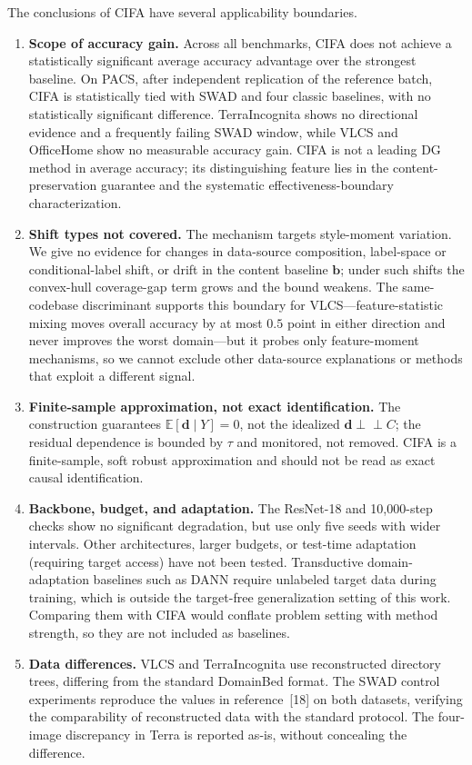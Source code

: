 \documentclass[electronics,article,submit,moreauthors]{Definitions/mdpi}
\newcommand{\add}[1]{\textcolor{addblue}{#1}}
\newcommand{\del}[1]{\textcolor{delred}{\st{#1}}}
\def\add#1{#1}
\def\del#1{}
\begin{document}
The conclusions of CIFA have several applicability boundaries.
\begin{enumerate}
\item \textbf{Scope of accuracy gain.} Across all benchmarks, CIFA does not achieve a statistically significant average accuracy advantage over the strongest baseline. On PACS, after independent replication of the reference batch, \del{CIFA is equivalent to SWAD and four classic baselines.}
\add{CIFA is statistically tied with SWAD and four classic baselines, with no statistically significant difference.} TerraIncognita shows no directional evidence and a frequently failing SWAD window, while VLCS and OfficeHome show no measurable accuracy gain. CIFA is not a leading DG method in average accuracy; its distinguishing feature lies in the content-preservation guarantee and the systematic \del{validity}\add{effectiveness}-boundary characterization.
\item \textbf{Shift types not covered.} The mechanism targets style-moment variation. We give no evidence for changes in data-source composition, label-space or conditional-label shift, or drift in the content baseline $\mathbf{b}$; under such shifts the convex-hull coverage-gap term grows and the bound weakens. The same-codebase discriminant supports this boundary for VLCS---feature-statistic mixing moves overall accuracy by at most $0.5$ point in either direction and never improves the worst domain---but it probes only feature-moment mechanisms, so we cannot exclude other data-source explanations or methods that exploit a different signal.
\item \textbf{Finite-sample approximation, not exact identification.} The construction guarantees $\mathbb{E}[\mathbf{d}\mid Y]=0$, not the idealized $\mathbf{d}\perp\!\!\!\perp C$; the residual dependence is bounded by $\tau$ and monitored, not removed. CIFA is a finite-sample, soft robust approximation and should not be read as exact causal identification.
\item \textbf{Backbone, budget, and adaptation.} The ResNet-18 and 10{,}000-step checks show no significant degradation, but use only five seeds with wider intervals. Other architectures, larger budgets, or test-time adaptation (requiring target access) have not been tested. Transductive domain-adaptation baselines such as DANN require unlabeled target data during training, which is outside the target-free generalization setting of this work. Comparing them with CIFA would conflate problem setting with method strength, so they are not included as baselines.
\item \textbf{Data differences.} VLCS and TerraIncognita use reconstructed directory trees, differing from the standard DomainBed format. The SWAD control experiments reproduce the values in reference~[18] on both datasets, verifying the comparability of reconstructed data with the standard protocol. The four-image discrepancy in Terra is reported as-is, without concealing the difference.
\end{enumerate}
\end{document}
